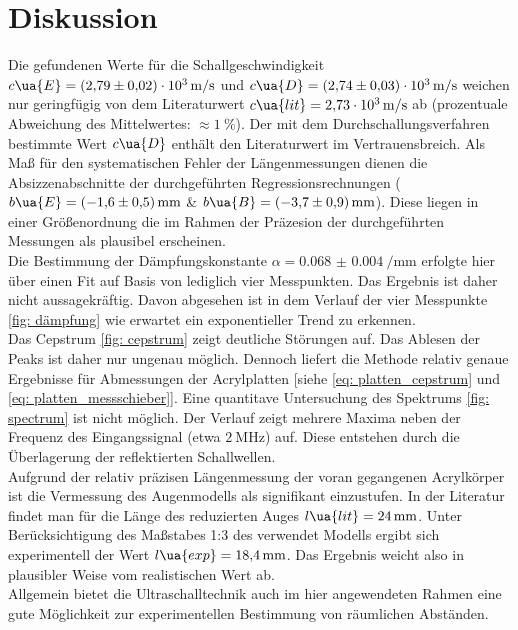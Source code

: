\newpage
\section{Diskussion}
Die gefundenen Werte für die Schallgeschwindigkeit $c\ua{E} = \SI{+2.79(2)e+03}{\meter\per\second}$ und
$c\ua{D} = \SI{+2.74(3)e+03}{\meter\per\second}$ weichen nur geringfügig von dem Literaturwert
$c\ua{lit} = \SI{2.73e3}{\meter\per\second}$ ab (prozentuale Abweichung des Mittelwertes: $\approx \SI{1}{\percent}$). %
Der mit dem Durchschallungsverfahren bestimmte Wert $c\ua{D}$
enthält den Literaturwert im Vertrauensbreich. Als Maß für den systematischen Fehler der Längenmessungen dienen
die Absizzenabschnitte der durchgeführten Regressionsrechnungen ($b\ua{E} = \SI{-1.6(5)}{\milli\meter}$ \&
$b\ua{B} = \SI{-3.7(9)}{\milli\meter}$). Diese liegen in einer Größenordnung die im Rahmen der Präzesion
der durchgeführten Messungen als plausibel erscheinen. \\
Die Bestimmung der Dämpfungskonstante $\alpha = \SI{0.068(4)}{\per\milli\meter}$ erfolgte hier über einen Fit
auf Basis von lediglich vier Messpunkten. Das Ergebnis ist daher nicht aussagekräftig. Davon abgesehen ist in
dem Verlauf der vier Messpunkte \ref{fig: dämpfung} wie erwartet ein exponentieller Trend zu erkennen.\\
Das Cepstrum \ref{fig: cepstrum} zeigt deutliche Störungen auf. Das Ablesen der Peaks ist daher nur ungenau möglich.
Dennoch liefert die Methode relativ genaue Ergebnisse für Abmessungen der Acrylplatten [siehe \ref{eq: platten_cepstrum} und \ref{eq: platten_messschieber}].
Eine quantitave Untersuchung des Spektrums \ref{fig: spectrum} ist nicht möglich. Der Verlauf zeigt mehrere %
Maxima neben der Frequenz des Eingangssignal (etwa $\SI{2}{\mega\hertz}$) auf. Diese entstehen durch die Überlagerung der
reflektierten Schallwellen. \\
Aufgrund der relativ präzisen Längenmessung der voran gegangenen Acrylkörper ist die Vermessung des Augenmodells als
signifikant einzustufen. In der Literatur \cite{sehen} findet man für die Länge des reduzierten Auges $l\ua{lit} = \SI{24}{\milli\meter}$. Unter
Berücksichtigung des Maßstabes 1:3 des verwendet Modells ergibt sich experimentell der Wert $l\ua{exp} = \SI{18.4}{\milli\meter}$. Das Ergebnis
weicht also in plausibler Weise vom realistischen Wert ab. \\
Allgemein bietet die Ultraschalltechnik auch im hier angewendeten Rahmen eine gute Möglichkeit zur experimentellen Bestimmung
von räumlichen Abständen.
